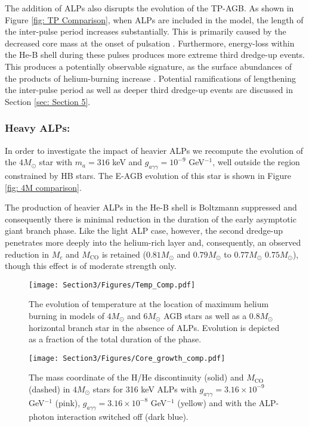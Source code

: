 The addition of ALPs also disrupts the evolution of the TP-AGB. As shown in Figure \ref{fig: TP Comparison}, when ALPs are included in the model, the length of the inter-pulse period increases substantially. This is primarily caused by the decreased core mass at the onset of pulsation \cite{Dominguez}. Furthermore, energy-loss within the He-B shell during these pulses produces more extreme third dredge-up events. This produces a potentially observable signature, as the surface abundances of the products of helium-burning increase \cite{Dominguez}. Potential ramifications of lengthening the inter-pulse period as well as deeper third dredge-up events are discussed in Section \ref{sec: Section 5}. 



\subsubsection*{Heavy ALPs:}

In order to investigate the impact of heavier ALPs we recompute the evolution of the $4M_{\odot}$ star with $m_a=316$ keV and $g_{a\gamma\gamma}=10^{-9}$ GeV$^{-1}$, well outside the region constrained by HB stars. The E-AGB evolution of this star is shown in Figure \ref{fig: 4M comparison}.



The production of heavier ALPs in the He-B shell is Boltzmann suppressed and consequently there is minimal reduction in the duration of the early asymptotic giant branch phase. Like the light ALP case, however, the second dredge-up penetrates more deeply into the helium-rich layer and, consequently, an observed reduction in $M_{c}$ and $M_{\mathrm{CO}}$ is retained ($0.81M_{\odot}$ and $0.79M_{\odot}$ to $0.77M_{\odot}$ $0.75M_{\odot}$), though this effect is of moderate strength only.

\begin{figure}[t]
\centering
\begin{minipage}[t]{.5\textwidth}
    \centering
    \captionsetup{width=0.9\textwidth}
    \texttt{[image: Section3/Figures/Temp\_Comp.pdf]}
    \caption{The evolution of temperature at the location of maximum helium burning in models of $4M_{\odot}$ and $6M_{\odot}$ AGB stars as well as a $0.8M_{\odot}$ horizontal branch star in the absence of ALPs. Evolution is depicted as a fraction of the total duration of the phase.}
    \label{fig: Temperature Evolution}
\end{minipage}%
\begin{minipage}[t]{.5\textwidth}
    \centering
    \captionsetup{width=0.9\textwidth}
    \texttt{[image: Section3/Figures/Core\_growth\_comp.pdf]}
    \caption{The mass coordinate of the H/He discontinuity (solid) and $M_{\mathrm{CO}}$ (dashed) in $4M_{\odot}$ stars for 316 keV ALPs with $g_{a\gamma\gamma}=3.16\times10^{-9}$ GeV$^{-1}$ (pink), $g_{a\gamma\gamma}=3.16\times10^{-8}$ GeV$^{-1}$ (yellow) and with the ALP-photon interaction switched off (dark blue).}
    \label{fig: Other tracks}
\end{minipage}
\end{figure}

